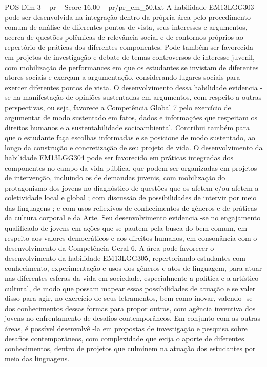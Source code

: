 \begin{textsample}{POS Dim 3 – pr – Score 16.00 – pr/pr\_em\_50.txt}
A habilidade EM13LGG303 pode ser desenvolvida na integração dentro da própria área pelo procedimento comum de análise de diferentes pontos de vista, seus interesses e argumentos, acerca de questões polêmicas de relevância social e de contornos próprios ao repertório de práticas dos diferentes componentes.
Pode também ser favorecida em projetos de investigação e debate de temas controversos de interesse juvenil, com mobilização de performances em que os estudantes se invistam de diferentes atores sociais e exerçam a argumentação, considerando lugares sociais para exercer diferentes pontos de vista.
O desenvolvimento dessa habilidade evidencia -se na manifestação de opiniões sustentadas em argumentos, com respeito a outras perspectivas, ou seja, favorece a Competência Global 7 pelo exercício de argumentar de modo sustentado em fatos, dados e informações que respeitam os direitos humanos e a sustentabilidade socioambiental.
Contribui também para que o estudante faça escolhas informadas e se posicione de modo sustentado, ao longo da construção e concretização de seu projeto de vida.
O desenvolvimento da habilidade EM13LGG304 pode ser favorecido em práticas integradas dos componentes no campo da vida pública, que podem ser organizadas em projetos de intervenção, incluindo os de demandas juvenis, com mobilização do protagonismo dos jovens no diagnóstico de questões que os afetem e/ou afetem a coletividade local e global ; com discussão de possibilidades de intervir por meio das linguagens ; e com usos reflexivos de conhecimentos de gêneros e de práticas da cultura corporal e da Arte.
Seu desenvolvimento evidencia -se no engajamento qualificado de jovens em ações que se pautem pela busca do bem comum, em respeito aos valores democráticos e aos direitos humanos, em consonância com o desenvolvimento da Competência Geral 6.
A área pode favorecer o desenvolvimento da habilidade EM13LGG305, repertoriando estudantes com conhecimento, experimentação e usos dos gêneros e atos de linguagem, para atuar nas diferentes esferas da vida em sociedade, especialmente a política e a artístico-cultural, de modo que possam mapear essas possibilidades de atuação e se valer disso para agir, no exercício de seus letramentos, bem como inovar, valendo -se dos conhecimentos dessas formas para propor outras, com agência inventiva dos jovens no enfrentamento de desafios contemporâneos.
Em conjunto com as outras áreas, é possível desenvolvê -la em propostas de investigação e pesquisa sobre desafios contemporâneos, com complexidade que exija o aporte de diferentes conhecimentos, dentro de projetos que culminem na atuação dos estudantes por meio das linguagens.

\end{textsample}
